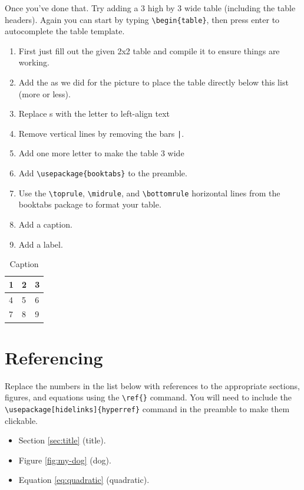         Once you've done that. Try adding a 3 high by 3 wide table (including the table headers). Again you can start by typing
        \verb"\begin{table}", then press enter to autocomplete the table template.
        \begin{enumerate}
            \item First just fill out the given 2x2 table and compile it to ensure things are working.
            \item Add the  as we did for the picture to place the table directly below this list (more or less).
            \item Replace s with the letter  to left-align text
            \item Remove vertical lines by removing the bars \verb"|".
            \item Add one more letter  to make the table 3 wide
            \item Add \verb"\usepackage{booktabs}" to the preamble.
            \item Use the \verb"\toprule", \verb"\midrule", and \verb"\bottomrule" horizontal lines from the booktabs package to format your table.
            \item Add a caption.
            \item Add a label.
        \end{enumerate}

        \begin{table}[h]
            \centering
            \begin{tabular}{lll}
            \toprule
                1 & 2 & 3 \\
            \midrule
                4 & 5 & 6 \\
                7 & 8 & 9 \\
            \bottomrule
            \end{tabular}
            \caption{Caption}
            \label{tab:my_label}
        \end{table}

    \lipsum[1]
    
    \section{Referencing}
        Replace the numbers in the list below with references to the appropriate sections, figures, and equations using the \verb"\ref{}" command. You will need to include the \verb"\usepackage[hidelinks]{hyperref}" command in the preamble to make them clickable.


        \begin{itemize}
            \item Section \ref{sec:title} (title).
            \item Figure \ref{fig:my-dog} (dog).
            \item Equation \ref{eq:quadratic} (quadratic).
        \end{itemize}
        

        

        
        
    


